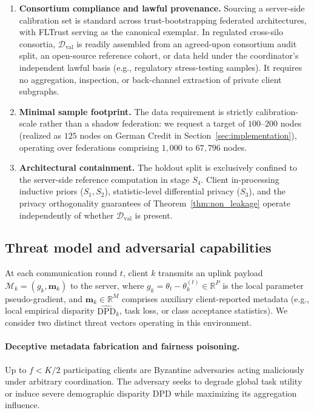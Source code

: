 \documentclass[preprint,12pt]{elsarticle}
\theoremstyle{plain}
\theoremstyle{definition}
\theoremstyle{remark}
\newcommand{\dpd}{\mathrm{DPD}}
\newcommand{\R}{\mathbb{R}}
\begin{document}
\begin{enumerate}
    \item \textbf{Consortium compliance and lawful provenance.} Sourcing a server-side calibration set is standard across trust-bootstrapping federated architectures, with FLTrust \cite{cao2021fltrust} serving as the canonical exemplar. In regulated cross-silo consortia, $\mathcal{D}_{\mathrm{val}}$ is readily assembled from an agreed-upon consortium audit split, an open-source reference cohort, or data held under the coordinator's independent lawful basis (e.g., regulatory stress-testing samples). It requires no aggregation, inspection, or back-channel extraction of private client subgraphs.
    \item \textbf{Minimal sample footprint.} The data requirement is strictly calibration-scale rather than a shadow federation: we request a target of $100\text{--}200$ nodes (realized as $125$ nodes on German Credit in Section~\ref{sec:implementation}), operating over federations comprising $1{,}000$ to $67{,}796$ nodes.
    \item \textbf{Architectural containment.} The holdout split is exclusively confined to the server-side reference computation in stage $S_4$. Client in-processing inductive priors ($S_1, S_2$), statistic-level differential privacy ($S_3$), and the privacy orthogonality guarantees of Theorem~\ref{thm:non_leakage} operate independently of whether $\mathcal{D}_{\mathrm{val}}$ is present.
\end{enumerate}

\subsection{Threat model and adversarial capabilities}
\label{sec:threat}
At each communication round $t$, client $k$ transmits an uplink payload $\mathcal{M}_k = (g_k, \bm{m}_k)$ to the server, where $g_k = \theta_t - \theta_k^{(t)} \in \R^P$ is the local parameter pseudo-gradient, and $\bm{m}_k \in \R^M$ comprises auxiliary client-reported metadata (e.g., local empirical disparity $\widehat{\dpd}_k$, task loss, or class acceptance statistics). We consider two distinct threat vectors operating in this environment.

\paragraph{Deceptive metadata fabrication and fairness poisoning.} Up to $f < K/2$ participating clients are Byzantine adversaries acting maliciously under arbitrary coordination. The adversary seeks to degrade global task utility or induce severe demographic disparity $\dpd$ while maximizing its aggregation influence. 
\end{document}
